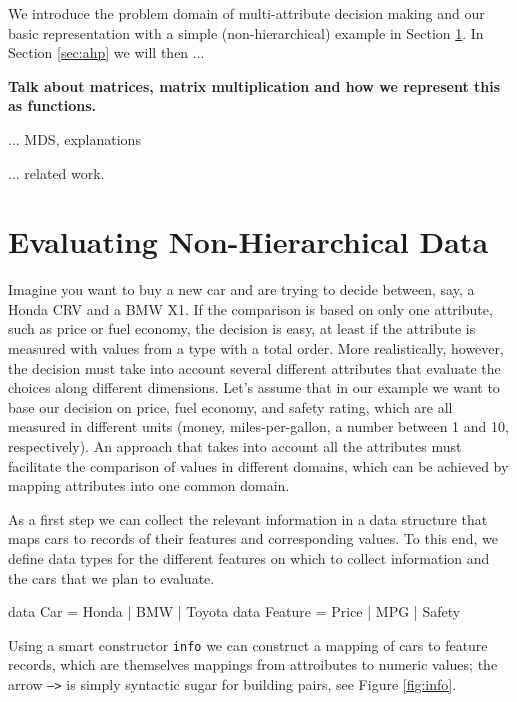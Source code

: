 \documentclass{jfp}
\newcommand{\NOTE}[2][gray]{\smallskip\noindent
  \colorbox{#1!30}{\parbox{.98\linewidth}{{\small\textbf{#2}}}}
}
\newcommand{\prog}[1]{\texttt{#1}}
\begin{document}
We introduce the problem domain of multi-attribute decision making and our basic representation with a simple (non-hierarchical) example in Section \ref{sec:flat}.
%
In Section \ref{sec:ahp} we will then ...

\NOTE{Talk about matrices, matrix multiplication and how we represent this as functions.}


... MDS, explanations 

... related work.



\section{Evaluating Non-Hierarchical Data}
\label{sec:flat}

Imagine you want to buy a new car and are trying to decide between, say, a Honda CRV and a BMW X1. If the comparison is based on only one attribute, such as price or fuel economy, the decision is easy, at least if the attribute is measured with values from a type with a total order. More realistically, however, the decision must take into account several different attributes that evaluate the choices along different dimensions. 
%
Let's assume that in our example we want to base our decision on price, fuel economy, and safety rating, which are all measured in different units (money, miles-per-gallon, a number between 1 and 10, respectively).
%
An approach that takes into account all the attributes must facilitate the comparison of values in different domains, which can be achieved by mapping attributes into one common domain.

As a first step we can collect the relevant information in a data structure that maps cars to records of their features and corresponding values. To this end, we define data types for the different features on which to collect information and the cars that we plan to evaluate.

\begin{haskellcode}
data Car     = Honda | BMW | Toyota
data Feature = Price | MPG | Safety 
\end{haskellcode}

\noindent
%
Using a smart constructor \prog{info} we can construct a mapping of cars to feature records, which are themselves mappings from attroibutes to numeric values; the arrow \prog{-->} is simply syntactic sugar for building pairs, see Figure \ref{fig:info}.
\end{document}
